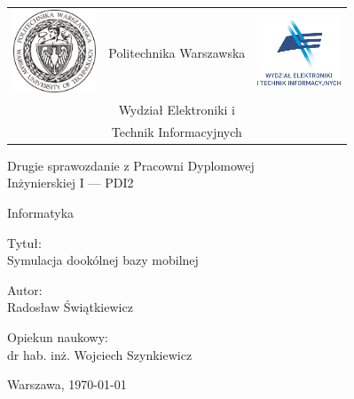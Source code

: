 \begin{titlepage}
\pagestyle{empty}

\noindent
\begin{large}
\begin{table}[t]
\centering
\begin{tabular}[t]{lcr}
 \includegraphics[width=70pt,height=70pt]{graphics/pw_logo.jpg} & Politechnika Warszawska & \includegraphics[width=70pt,height=70pt]{graphics/weiti_logo.pdf}\\
& Wydział Elektroniki i & \\
& Technik Informacyjnych &
\end{tabular}
\end{table}

\begin{center}Drugie sprawozdanie z Pracowni Dyplomowej \\ Inżynierskiej I --- PDI2\end{center}
\begin{center}Informatyka\end{center}\end{large}

\vfill
\begin{center}
\large
Tytuł: \\
\Huge
Symulacja dookólnej bazy mobilnej
\end{center}

\vfill
\begin{center}
\large
Autor: \\
\Large
Radosław Świątkiewicz
\end{center}

\vfill
\begin{center}
\large
Opiekun naukowy: \\
\Large
dr hab. inż. Wojciech Szynkiewicz
\end{center}

\vfill
\begin{center}
Warszawa, \today
\end{center}

\end{titlepage}